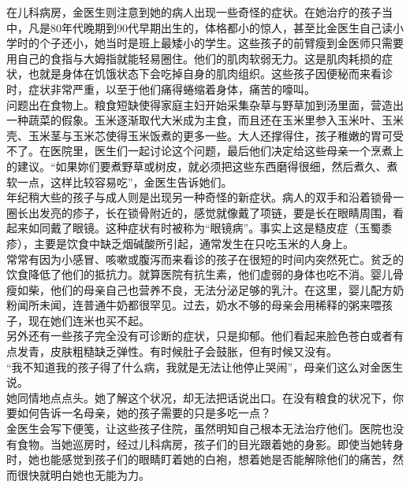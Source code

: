 在儿科病房，金医生则注意到她的病人出现一些奇怪的症状。在她治疗的孩子当中，凡是80年代晚期到90代早期出生的，体格都小的惊人，甚至比金医生自己读小学时的个子还小，她当时是班上最矮小的学生。这些孩子的前臂瘦到金医师只需要用自己的食指与大姆指就能轻易圈住。他们的肌肉软弱无力。这是肌肉耗损的症状，也就是身体在饥饿状态下会吃掉自身的肌肉组织。这些孩子因便秘而来看诊时，症状非常严重，以至于他们痛得蜷缩着身体，痛苦的嚎叫。\\

问题出在食物上。粮食短缺使得家庭主妇开始采集杂草与野草加到汤里面，营造出一种蔬菜的假象。玉米逐渐取代大米成为主食，而且还在玉米里参入玉米叶、玉米壳、玉米茎与玉米芯使得玉米饭煮的更多一些。大人还撑得住，孩子稚嫩的胃可受不了。在医院里，医生们一起讨论这个问题，最后他们决定给这些母亲一个烹煮上的建议。“如果妳们要煮野草或树皮，就必须把这些东西磨得很细，然后煮久、煮软一点，这样比较容易吃”，金医生告诉她们。\\

年纪稍大些的孩子与成人则是出现另一种奇怪的新症状。病人的双手和沿着锁骨一圈长出发亮的疹子，长在锁骨附近的，感觉就像戴了项链，要是长在眼睛周围，看起来如同戴了眼镜。这种症状有时被称为“眼镜病”。事实上这是糙皮症（玉蜀黍疹），主要是饮食中缺乏烟碱酸所引起，通常发生在只吃玉米的人身上。\\

常常有因为小感冒、咳嗽或腹泻而来看诊的孩子在很短的时间内突然死亡。贫乏的饮食降低了他们的抵抗力。就算医院有抗生素，他们虚弱的身体也吃不消。婴儿骨瘦如柴，他们的母亲自己也营养不良，无法分泌足够的乳汁。在这里，婴儿配方奶粉闻所未闻，连普通牛奶都很罕见。过去，奶水不够的母亲会用稀释的粥来喂孩子，现在她们连米也买不起。\\

另外还有一些孩子完全没有可诊断的症状，只是抑郁。他们看起来脸色苍白或者有点发青，皮肤粗糙缺乏弹性。有时候肚子会鼓胀，但有时候又没有。\\

“我不知道我的孩子得了什么病，我就是无法让他停止哭闹”，母亲们这么对金医生说。\\

她同情地点点头。她了解这个状况，却无法把话说出口。在没有粮食的状况下，你要如何告诉一名母亲，她的孩子需要的只是多吃一点？\\

金医生会写下便笺，让这些孩子住院，虽然明知自己根本无法治疗他们。医院也没有食物。当她巡房时，经过儿科病房，孩子们的目光跟着她的身影。即使当她转身时，她也能感觉到孩子们的眼睛盯着她的白袍，想着她是否能解除他们的痛苦，然而很快就明白她也无能为力。\\

